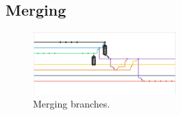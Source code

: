 \documentclass[english]{article}
\begin{document}
\subsection{Merging}
\begin{figure}
	\caption{Merging branches.}
	\label{wrap-fig:9}
	\includegraphics[width=5.5cm]{images/merging.png}
\end{figure} 

		
\end{document}
